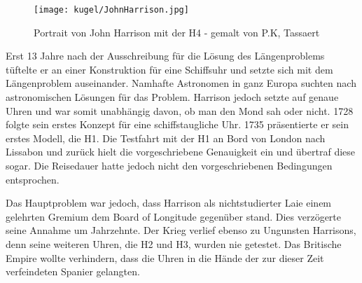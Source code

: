 \begin{refsection}
\begin{figure}[htbp]
\centering
\texttt{[image: kugel/JohnHarrison.jpg]}
\caption{Portrait von John Harrison mit der H4 - gemalt von P.K, Tassaert}
\end{figure}

Erst 13 Jahre nach der Ausschreibung für die Lösung des Längenproblems tüftelte er an einer Konstruktion für eine Schiffsuhr und setzte sich mit dem Längenproblem auseinander.
Namhafte Astronomen in ganz Europa suchten nach astronomischen Lösungen für das Problem. Harrison jedoch setzte auf genaue Uhren und war somit unabhängig davon, ob man den Mond sah oder nicht.
1728 folgte sein erstes Konzept für eine schiffstaugliche Uhr. 1735 präsentierte er sein erstes Modell, die H1. Die Testfahrt mit der H1 an Bord von London nach Lissabon und zurück hielt die vorgeschriebene Genauigkeit ein und übertraf diese sogar. Die Reisedauer hatte jedoch nicht den vorgeschriebenen Bedingungen entsprochen.

Das Hauptproblem war jedoch, dass Harrison als nichtstudierter Laie einem gelehrten Gremium dem Board of Longitude gegenüber stand. Dies verzögerte seine Annahme um Jahrzehnte. Der Krieg verlief ebenso zu Ungunsten Harrisons, denn seine weiteren Uhren, die H2 und H3, wurden nie getestet. Das Britische Empire wollte verhindern, dass die Uhren in die Hände der zur dieser Zeit verfeindeten Spanier gelangten.


\end{refsection}

